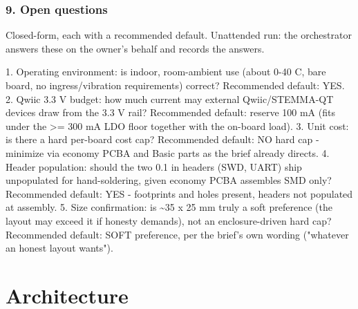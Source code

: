 \documentclass[11pt,a4paper]{article}
\begin{document}
\subsubsection*{9. Open questions}
Closed-form, each with a recommended default. Unattended run: the orchestrator answers these on the owner's behalf and records the answers.

1. Operating environment: is indoor, room-ambient use (about 0-40 C, bare board, no ingress/vibration requirements) correct? Recommended default: YES. 2. Qwiic 3.3 V budget: how much current may external Qwiic/STEMMA-QT devices draw from the 3.3 V rail? Recommended default: reserve 100 mA (fits under the \textgreater{}= 300 mA LDO floor together with the on-board load). 3. Unit cost: is there a hard per-board cost cap? Recommended default: NO hard cap - minimize via economy PCBA and Basic parts as the brief already directs. 4. Header population: should the two 0.1 in headers (SWD, UART) ship unpopulated for hand-soldering, given economy PCBA assembles SMD only? Recommended default: YES - footprints and holes present, headers not populated at assembly. 5. Size confirmation: is \textasciitilde{}35 x 25 mm truly a soft preference (the layout may exceed it if honesty demands), not an enclosure-driven hard cap? Recommended default: SOFT preference, per the brief's own wording ("whatever an honest layout wants").

\section{Architecture}
\end{document}
